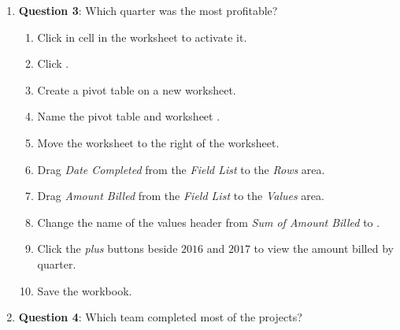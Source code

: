 \begin{enumbox}
\begin{enumerate}
		\item{\textbf{Question 3}: Which quarter was the most profitable?}
	
		\begin{enumerate}
			\item Click in cell  in the  worksheet to activate it.
			\item Click .
			\item Create a pivot table on a new worksheet.
			\item Name the pivot table and worksheet .
			\item Move the  worksheet to the right of the  worksheet.
			\item Drag \textit{Date Completed} from the \textit{Field List} to the \textit{Rows} area.
			\item Drag \textit{Amount Billed} from the \textit{Field List} to the \textit{Values} area.
			\item Change the name of the values header from \textit{Sum of Amount Billed} to .
			\item Click the \textit{plus} buttons beside $ 2016 $ and $ 2017 $ to view the amount billed by quarter.
			\item Save the  workbook.
		\end{enumerate}
		
		\item{\textbf{Question 4}: Which team completed most of the projects?}
	

\end{enumerate}
\end{enumbox}
